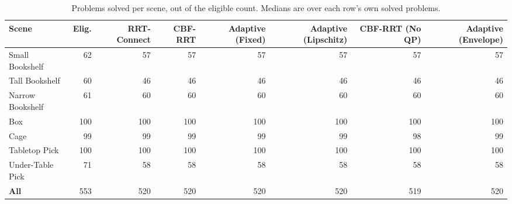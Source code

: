 \begin{table}[t]
  \centering
  \caption{Problems solved per scene, out of the eligible count. Medians are over each row's own solved problems.}
  \label{tab:mbm-per-scene-solved}
  \small
  \begin{tabular}{lrrrrrrr}
    \toprule
    Scene & Elig. & RRT-Connect & CBF-RRT & Adaptive (Fixed) & Adaptive (Lipschitz) & CBF-RRT (No QP) & Adaptive (Envelope) \\
    \midrule
    Small Bookshelf & 62 & 57 & 57 & 57 & 57 & 57 & 57 \\
    Tall Bookshelf & 60 & 46 & 46 & 46 & 46 & 46 & 46 \\
    Narrow Bookshelf & 61 & 60 & 60 & 60 & 60 & 60 & 60 \\
    Box & 100 & 100 & 100 & 100 & 100 & 100 & 100 \\
    Cage & 99 & 99 & 99 & 99 & 99 & 98 & 99 \\
    Tabletop Pick & 100 & 100 & 100 & 100 & 100 & 100 & 100 \\
    Under-Table Pick & 71 & 58 & 58 & 58 & 58 & 58 & 58 \\
    \midrule
    \textbf{All} & 553 & 520 & 520 & 520 & 520 & 519 & 520 \\
    \bottomrule
  \end{tabular}
\end{table}
